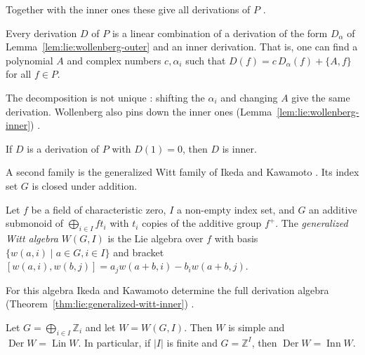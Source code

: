Together with the inner ones these give all derivations of $P$
\cite[Theorem~1, p.~318]{Wollenberg1969}.

\begin{theorem}\label{thm:lie:wollenberg-derivations}
Every derivation $D$ of $P$ is a linear combination of a derivation of
the form $D_{\alpha}$ of Lemma~\ref{lem:lie:wollenberg-outer} and an inner
derivation.  That is, one can find a polynomial $A$ and complex numbers
$c,\alpha_{i}$ such that $D(f)=c\,D_{\alpha}(f)+\{A,f\}$ for all $f\in P$.
\end{theorem}

The decomposition is not unique \cite[Remark, p.~318]{Wollenberg1969}:
shifting the $\alpha_{i}$ and changing $A$ give the same derivation.
Wollenberg also pins down the inner ones (Lemma~\ref{lem:lie:wollenberg-inner})
\cite[Lemma~3, p.~317]{Wollenberg1969}.\begin{lemma}\label{lem:lie:wollenberg-inner}
If $D$ is a derivation of $P$ with $D(1)=0$, then $D$ is inner.
\end{lemma}

A second family is the generalized Witt family of Ikeda and Kawamoto
\cite[p.~47]{IkedaKawamoto1990}.  Its index set $G$ is closed under
addition.

\begin{definition}\label{def:lie:generalized-witt}
Let $f$ be a field of characteristic zero, $I$ a non-empty index set, and
$G$ an additive submonoid of $\bigoplus_{i\in I} f t_{i}$ with
$t_{i}$ copies of the additive group $f^{+}$.  The \emph{generalized Witt
algebra} $W(G,I)$ is the Lie algebra over $f$ with basis
$\{w(a,i)\mid a\in G, i\in I\}$ and bracket
$[w(a,i),w(b,j)]=a_{j}w(a+b,i)-b_{i}w(a+b,j)$.
\end{definition}

For this algebra Ikeda and Kawamoto determine the full derivation
algebra (Theorem~\ref{thm:lie:generalized-witt-inner}) \cite[Theorem~2, p.~54]{IkedaKawamoto1990}.

\begin{theorem}\label{thm:lie:generalized-witt-inner}
Let $G=\bigoplus_{i\in I}\mathbb{Z}_{i}$ and let $W=W(G,I)$.  Then $W$ is
simple and $\operatorname{Der} W=\operatorname{Lin} W$.  In particular, if
$|I|$ is finite and $G=\mathbb{Z}^{I}$, then
$\operatorname{Der} W=\operatorname{Inn} W$.
\end{theorem}

